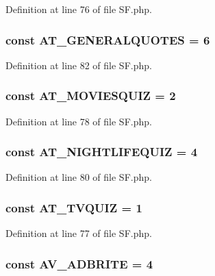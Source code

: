 Definition at line 76 of file SF.php.

\hypertarget{classSF_a55f6c8b6984b1ca031042ffa29412776}{
\subsubsection[{AT\_\-GENERALQUOTES}]{\setlength{\rightskip}{0pt plus 5cm}const {\bf AT\_\-GENERALQUOTES} = 6}}
\label{classSF_a55f6c8b6984b1ca031042ffa29412776}


Definition at line 82 of file SF.php.

\hypertarget{classSF_ab3bdff48597c946be8bbd7e2a6c50d6f}{
\subsubsection[{AT\_\-MOVIESQUIZ}]{\setlength{\rightskip}{0pt plus 5cm}const {\bf AT\_\-MOVIESQUIZ} = 2}}
\label{classSF_ab3bdff48597c946be8bbd7e2a6c50d6f}


Definition at line 78 of file SF.php.

\hypertarget{classSF_afde3b6f3fa7656696202c93057cf0ab9}{
\subsubsection[{AT\_\-NIGHTLIFEQUIZ}]{\setlength{\rightskip}{0pt plus 5cm}const {\bf AT\_\-NIGHTLIFEQUIZ} = 4}}
\label{classSF_afde3b6f3fa7656696202c93057cf0ab9}


Definition at line 80 of file SF.php.

\hypertarget{classSF_ab0237863b4ffaf75368d62ae9d5019f5}{
\subsubsection[{AT\_\-TVQUIZ}]{\setlength{\rightskip}{0pt plus 5cm}const {\bf AT\_\-TVQUIZ} = 1}}
\label{classSF_ab0237863b4ffaf75368d62ae9d5019f5}


Definition at line 77 of file SF.php.

\hypertarget{classSF_ac426936bf124441cc66b462fead5e51c}{
\subsubsection[{AV\_\-ADBRITE}]{\setlength{\rightskip}{0pt plus 5cm}const {\bf AV\_\-ADBRITE} = 4}}
\label{classSF_ac426936bf124441cc66b462fead5e51c}


